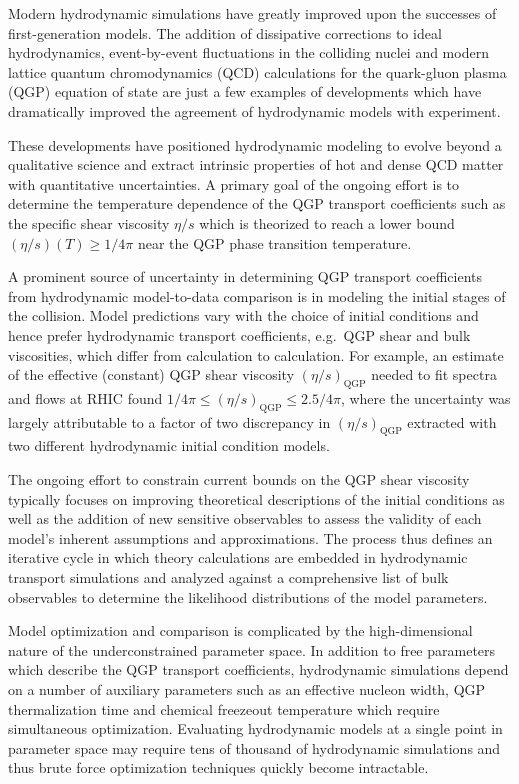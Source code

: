 \documentclass[aps,prc,reprint,amsmath]{revtex4-1}
\begin{document}
Modern hydrodynamic simulations have greatly improved upon the successes of first-generation models. The addition of dissipative corrections to ideal hydrodynamics, event-by-event fluctuations in the colliding nuclei and modern lattice quantum chromodynamics (QCD) calculations for the quark-gluon plasma (QGP) equation of state are just a few examples of developments which have dramatically improved the agreement of hydrodynamic models with experiment.

These developments have positioned hydrodynamic modeling to evolve beyond a qualitative science and extract intrinsic properties of hot and dense QCD matter with quantitative uncertainties. A primary goal of the ongoing effort is to determine the temperature dependence of the QGP transport coefficients such as the specific shear viscosity $\eta/s$ which is theorized to reach a lower bound ${(\eta/s)(T) \ge 1/4\pi}$ near the QGP phase transition temperature. 

A prominent source of uncertainty in determining QGP transport coefficients from hydrodynamic model-to-data comparison is in modeling the initial stages of the collision. Model predictions vary with the choice of initial conditions and hence prefer hydrodynamic transport coefficients, e.g.\ QGP shear and bulk viscosities, which differ from calculation to calculation. For example, an estimate of the effective (constant) QGP shear viscosity $(\eta/s)_\text{QGP}$ needed to fit spectra and flows at RHIC found ${1/4\pi \le (\eta/s)_\text{QGP} \le 2.5/4\pi}$, where the uncertainty was largely attributable to a factor of two discrepancy in $(\eta/s)_\text{QGP}$ extracted with two different hydrodynamic initial condition models. 

The ongoing effort to constrain current bounds on the QGP shear viscosity typically focuses on improving theoretical descriptions of the initial conditions as well as the addition of new sensitive observables to assess the validity of each model's inherent assumptions and approximations. The process thus defines an iterative cycle in which theory calculations are embedded in hydrodynamic transport simulations and analyzed against a comprehensive list of bulk observables to determine the likelihood distributions of the model parameters.

Model optimization and comparison is complicated by the high-dimensional nature of the underconstrained parameter space. In addition to free parameters which describe the QGP transport coefficients, hydrodynamic simulations depend on a number of auxiliary parameters such as an effective nucleon width, QGP thermalization time and chemical freezeout temperature which require simultaneous optimization. Evaluating hydrodynamic models at a single point in parameter space may require tens of thousand of hydrodynamic simulations and thus brute force optimization techniques quickly become intractable. 
\end{document}
